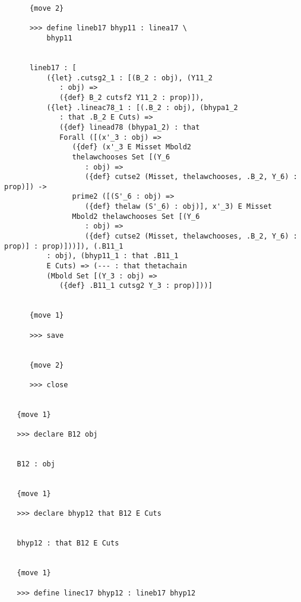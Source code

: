 \documentclass[12pt]{article}
\begin{document}
\begin{verbatim}
      {move 2}

      >>> define lineb17 bhyp11 : linea17 \
          bhyp11


      lineb17 : [
          ({let} .cutsg2_1 : [(B_2 : obj), (Y11_2 
             : obj) => 
             ({def} B_2 cutsf2 Y11_2 : prop)]), 
          ({let} .lineac78_1 : [(.B_2 : obj), (bhypa1_2 
             : that .B_2 E Cuts) => 
             ({def} linead78 (bhypa1_2) : that 
             Forall ([(x'_3 : obj) => 
                ({def} (x'_3 E Misset Mbold2 
                thelawchooses Set [(Y_6 
                   : obj) => 
                   ({def} cutse2 (Misset, thelawchooses, .B_2, Y_6) : prop)]) -> 
                prime2 ([(S'_6 : obj) => 
                   ({def} thelaw (S'_6) : obj)], x'_3) E Misset 
                Mbold2 thelawchooses Set [(Y_6 
                   : obj) => 
                   ({def} cutse2 (Misset, thelawchooses, .B_2, Y_6) : prop)] : prop)]))]), (.B11_1 
          : obj), (bhyp11_1 : that .B11_1 
          E Cuts) => (--- : that thetachain 
          (Mbold Set [(Y_3 : obj) => 
             ({def} .B11_1 cutsg2 Y_3 : prop)]))]


      {move 1}

      >>> save


      {move 2}

      >>> close


   {move 1}

   >>> declare B12 obj


   B12 : obj


   {move 1}

   >>> declare bhyp12 that B12 E Cuts


   bhyp12 : that B12 E Cuts


   {move 1}

   >>> define linec17 bhyp12 : lineb17 bhyp12



\end{verbatim}
\end{document}
